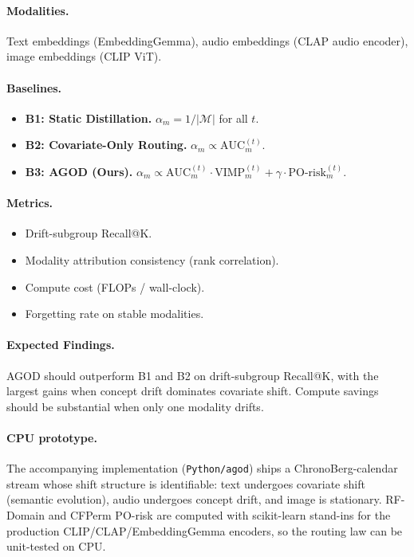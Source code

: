 \documentclass[11pt]{article}
\begin{document}
\paragraph{Modalities.} Text embeddings (EmbeddingGemma), audio embeddings (CLAP audio encoder), image embeddings (CLIP ViT).

\paragraph{Baselines.}
\begin{itemize}
    \item \textbf{B1: Static Distillation.} \(\alpha_m = 1/|\mathcal{M}|\) for all \(t\).
    \item \textbf{B2: Covariate-Only Routing.} \(\alpha_m \propto \text{AUC}_m^{(t)}\).
    \item \textbf{B3: AGOD (Ours).} \(\alpha_m \propto \text{AUC}_m^{(t)} \cdot \text{VIMP}_m^{(t)} + \gamma \cdot \text{PO-risk}_m^{(t)}\).
\end{itemize}

\paragraph{Metrics.}
\begin{itemize}
    \item Drift-subgroup Recall@K.
    \item Modality attribution consistency (rank correlation).
    \item Compute cost (FLOPs / wall-clock).
    \item Forgetting rate on stable modalities.
\end{itemize}

\paragraph{Expected Findings.}
AGOD should outperform B1 and B2 on drift-subgroup Recall@K, with the largest gains when concept drift dominates covariate shift. Compute savings should be substantial when only one modality drifts.

\paragraph{CPU prototype.}
The accompanying implementation (\texttt{Python/agod}) ships a ChronoBerg-calendar stream whose shift structure is identifiable: text undergoes covariate shift (semantic evolution), audio undergoes concept drift, and image is stationary. RF-Domain and CFPerm PO-risk are computed with scikit-learn stand-ins for the production CLIP/CLAP/EmbeddingGemma encoders, so the routing law can be unit-tested on CPU.
\end{document}
